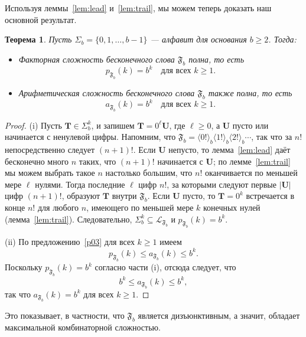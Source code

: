 \documentclass[a4paper,14pt]{extreport}
\theoremstyle{plain}
\newtheorem{theorem}{Теорема}[section]
\theoremstyle{definition}
\theoremstyle{remark}
\begin{document}
Используя леммы~\ref{lem:lead} и~\ref{lem:trail}, мы можем теперь доказать наш основной результат.

\begin{theorem}\label{mainthm01}
	Пусть $\Sigma_{b} = \{0,1,\dots,b-1\}$ --- алфавит для основания $b \geq 2$. Тогда:
	\begin{itemize}
		\item[(i)] Факторная сложность бесконечного слова $\mathfrak{F}_{b}$ полна, то есть
		\begin{equation}
			p_{\mathfrak{F}_{b}}(k) = b^{k} \quad \text{для всех } k \geq 1.
		\end{equation}
		\item[(ii)] Арифметическая сложность бесконечного слова $\mathfrak{F}_{b}$ также полна, то есть
		\begin{equation}
			a_{\mathfrak{F}_{b}}(k) = b^{k} \quad \text{для всех } k \geq 1.
		\end{equation}
	\end{itemize}
\end{theorem}

\begin{proof}
	(i) Пусть $\mathbf T\in\Sigma_b^k$, и запишем $\mathbf T=0^{\ell}\mathbf U$, где $\ell\ge0$, а $\mathbf U$ пусто или начинается с ненулевой цифры.
	Напомним, что $\mathfrak F_b=\langle0!\rangle_b\langle1!\rangle_b\langle2!\rangle_b\cdots$, так что за $n!$ непосредственно следует $(n+1)!$.
	Если $\mathbf U$ непусто, то лемма~\ref{lem:lead} даёт бесконечно много $n$ таких, что $(n+1)!$ начинается с $\mathbf U$; по лемме~\ref{lem:trail} мы можем выбрать такое $n$ настолько большим, что $n!$ оканчивается по меньшей мере $\ell$ нулями. Тогда последние $\ell$ цифр $n!$, за которыми следуют первые $|\mathbf U|$ цифр $(n+1)!$, образуют $\mathbf T$ внутри $\mathfrak F_b$.
	Если $\mathbf U$ пусто, то $\mathbf T=0^k$ встречается в конце $n!$ для любого $n$, имеющего по меньшей мере $k$ конечных нулей (лемма~\ref{lem:trail}).
	Следовательно, $\Sigma_b^k\subseteq\mathcal L_{\mathfrak F_b}$ и $p_{\mathfrak F_b}(k)=b^k$. 
	
	(ii) По предложению~\ref{p03} для всех $k \geq 1$ имеем
	\begin{equation}
		p_{\mathfrak{F}_{b}}(k) \leq a_{\mathfrak{F}_{b}}(k) \leq b^{k}.
	\end{equation}
	Поскольку $p_{\mathfrak{F}_{b}}(k) = b^{k}$ согласно части (i), отсюда следует, что
	\begin{equation}
		b^{k} \leq a_{\mathfrak{F}_{b}}(k) \leq b^{k},
	\end{equation}
	так что $a_{\mathfrak{F}_{b}}(k) = b^{k}$ для всех $k \geq 1$.
\end{proof}
Это показывает, в частности, что $\mathfrak{F}_{b}$ является дизъюнктивным, а значит, обладает максимальной комбинаторной сложностью.
\end{document}
